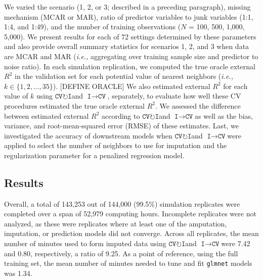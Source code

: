 \documentclass[AMA,STIX1COL,doublespace]{WileyNJD-v2}
\begin{document}
We varied the scenario (1, 2, or 3; described in a preceding paragraph),
missing mechanism (MCAR or MAR), ratio of predictor variables to junk
variables (1:1, 1:4, and 1:49), and the number of training observations
(\(N\) = 100, 500, 1,000, 5,000). We present results for each of 72
settings determined by these parameters and also provide overall summary
statistics for scenarios 1, 2, and 3 when data are MCAR and MAR
(\textit{i.e., }aggregating over training sample size and predictor to
noise ratio). In each simulation replication, we computed the true
oracle external \(R^2\) in the validation set for each potential value
of nearest neighbors
(\textit{i.e., }\(k \in \lbrace 1, 2, \ldots, 35 \rbrace\)). {[}DEFINE
ORACLE{]} We also estimated external \(R^2\) for each value of \(k\)
using $\texttt{CV}\!\circlearrowright\!\texttt{I}$\space and
$\texttt{I}\!\!\rightarrow\!\texttt{CV}$, separately, to evaluate how
well these CV procedures estimated the true oracle external \(R^2\). We
assessed the difference between estimated external \(R^2\) according to
$\texttt{CV}\!\circlearrowright\!\texttt{I}$\space and
$\texttt{I}\!\!\rightarrow\!\texttt{CV}$\space as well as the bias,
variance, and root-mean-squared error (RMSE) of these estimates. Last,
we investigated the accuracy of downstream models when
$\texttt{CV}\!\circlearrowright\!\texttt{I}$\space and
$\texttt{I}\!\!\rightarrow\!\texttt{CV}$\space were applied to select
the number of neighbors to use for imputation and the regularization
parameter for a penalized regression model.

\subsection{Results} \label{subsec:sim_results}

Overall, a total of 143,253 out of 144,000 (99.5\%) simulation
replicates were completed over a span of 52,979 computing hours.
Incomplete replicates were not analyzed, as these were replicates where
at least one of the amputation, imputation, or prediction models did not
converge. Across all replicates, the mean number of minutes used to form
imputed data using
$\texttt{CV}\!\circlearrowright\!\texttt{I}$\space and
$\texttt{I}\!\!\rightarrow\!\texttt{CV}$\space were 7.42 and 0.80,
respectively, a ratio of 9.25. As a point of reference, using the full
training set, the mean number of minutes needed to tune and fit
\texttt{glmnet} models was 1.34.
\end{document}
